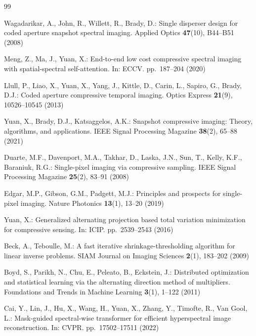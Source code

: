 \documentclass[runningheads]{llncs}
\begin{document}

\begin{thebibliography}{99}

Wagadarikar, A., John, R., Willett, R., Brady, D.:
Single disperser design for coded aperture snapshot spectral imaging.
Applied Optics \textbf{47}(10), B44--B51 (2008)

Meng, Z., Ma, J., Yuan, X.:
End-to-end low cost compressive spectral imaging with spatial-spectral self-attention.
In: ECCV. pp.~187--204 (2020)

Llull, P., Liao, X., Yuan, X., Yang, J., Kittle, D., Carin, L., Sapiro, G., Brady, D.J.:
Coded aperture compressive temporal imaging.
Optics Express \textbf{21}(9), 10526--10545 (2013)

Yuan, X., Brady, D.J., Katsaggelos, A.K.:
Snapshot compressive imaging: Theory, algorithms, and applications.
IEEE Signal Processing Magazine \textbf{38}(2), 65--88 (2021)

Duarte, M.F., Davenport, M.A., Takhar, D., Laska, J.N., Sun, T., Kelly, K.F., Baraniuk, R.G.:
Single-pixel imaging via compressive sampling.
IEEE Signal Processing Magazine \textbf{25}(2), 83--91 (2008)

Edgar, M.P., Gibson, G.M., Padgett, M.J.:
Principles and prospects for single-pixel imaging.
Nature Photonics \textbf{13}(1), 13--20 (2019)

Yuan, X.:
Generalized alternating projection based total variation minimization for compressive sensing.
In: ICIP. pp.~2539--2543 (2016)

Beck, A., Teboulle, M.:
A fast iterative shrinkage-thresholding algorithm for linear inverse problems.
SIAM Journal on Imaging Sciences \textbf{2}(1), 183--202 (2009)

Boyd, S., Parikh, N., Chu, E., Peleato, B., Eckstein, J.:
Distributed optimization and statistical learning via the alternating direction method of multipliers.
Foundations and Trends in Machine Learning \textbf{3}(1), 1--122 (2011)

Cai, Y., Lin, J., Hu, X., Wang, H., Yuan, X., Zhang, Y., Timofte, R., Van Gool, L.:
Mask-guided spectral-wise transformer for efficient hyperspectral image reconstruction.
In: CVPR. pp.~17502--17511 (2022)


\end{thebibliography}
\end{document}

